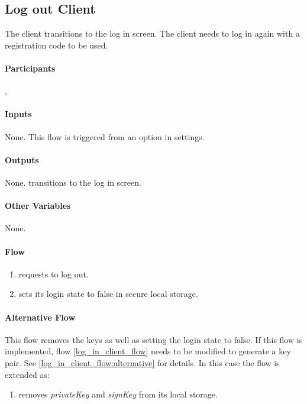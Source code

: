 \documentclass[a4paper,10pt,draft]{article}
\newcommand{\privateKey}{\emph{privateKey}}
\newcommand{\signKey}{\emph{signKey}}
\begin{document}
\subsection{Log out Client}
\label{log_out_client_flow}
The client transitions to the log in screen. The client needs to log in again with a registration code to be used.

\paragraph{Participants} \Client{}, \User{}

\paragraph{Inputs}
None. This flow is triggered from an option in settings.

\paragraph{Outputs}
None. \Client{} transitions to the log in screen.

\paragraph{Other Variables}
None.

\paragraph{Flow}

\begin{enumerate}
 \item \User{} requests to log out.
 \item \Client{} sets its login state to false in secure local storage.
\end{enumerate}

\paragraph{Alternative Flow}
\label{log_out_client_flow:alternative}

This flow removes the keys as well as setting the login state to false. If this flow is implemented, flow \ref{log_in_client_flow} needs to be modified to generate a key pair. See 
\ref{log_in_client_flow:alternative} for details. In this case the flow is extended as:

\begin{enumerate}[resume]
 \item \Client{} removes \privateKey{} and \signKey{} from its local storage.
\end{enumerate}
\end{document}
